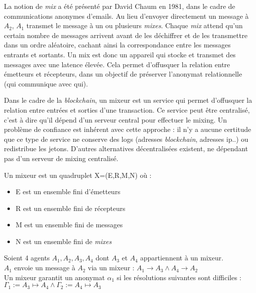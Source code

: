 La notion de \og\textit{mix}\fg\cite{mix_wp} a été présenté par David Chaum
en 1981, dans le cadre de communications anonymes d'emails.
Au lieu d'envoyer directement un message à $A_2$, $A_1$ transmet le message 
à un ou plusieurs \textit{mixes}. Chaque \textit{mix} attend 
qu'un certain nombre de messages arrivent avant de les déchiffrer et de les
transmettre dans un ordre aléatoire, cachant ainsi la correspondance entre 
les messages entrants et sortants. Un mix est donc un appareil qui stocke 
et transmet des messages avec une latence élevée.
Cela permet d'offusquer la relation entre émetteurs et récepteurs, dans un objectif 
de préserver l'anonymat relationnelle (qui communique avec qui).

\medskip 
\noindent
Dans le cadre de la \textit{blockchain}, un mixeur est un service 
qui permet d'offusquer la relation entre entrées et sorties d'une transaction.
Ce service peut être centralisé, c'est à dire qu'il dépend d'un serveur 
central pour effectuer le mixing.
Un problème de confiance est inhérent avec cette approche : il n'y a 
aucune certitude que ce type de service ne conserve des logs 
(adresses \textit{blockchain}, adresses \acrshort{ip}..) ou redistribue 
les jetons. D'autres alternatives décentralisées existent, 
ne dépendant pas d'un serveur de mixing centralisé.

\begin{definition}[Mixeur]
    Un mixeur est un quadruplet X=(E,R,M,N) où :
    \begin{itemize}
        \item E est un ensemble fini d'émetteurs 
        \item R est un ensemble fini de récepteurs
        \item M est un ensemble fini de messages
        \item N est un ensemble fini de {\textit{mixes}}
    \end{itemize}
\end{definition}

\begin{proposition}
    Soient 4 agents $A_1, A_2, A_3, A_4$ dont $A_3$ et $A_4$ appartiennent à un mixeur.\\
    $A_1$ envoie un message à $A_2$ via un mixeur : $A_1 \rightarrow A_3 \wedge A_4 
    \rightarrow A_2$\\
    Un mixeur garantit un anonymat $\alpha_1$ si les résolutions suivantes sont difficiles 
    :\\
    $\Gamma_1 := A_3 \mapsto A_4 \wedge \Gamma_2 := A_4 \mapsto A_3$
\end{proposition}